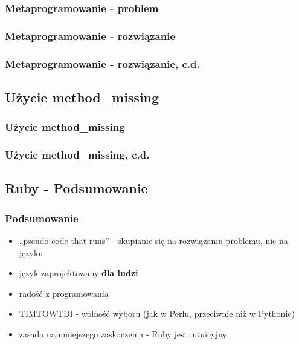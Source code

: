\documentclass[12t]{beamer}
\begin{document}
\begin{frame}[fragile]
  \frametitle{Metaprogramowanie - problem}
  
\end{frame}


\begin{frame}[fragile]
  \frametitle{Metaprogramowanie - rozwiązanie}
  
\end{frame}

\begin{frame}[fragile]
  \frametitle{Metaprogramowanie - rozwiązanie, c.d.}
  
\end{frame}

\subsection{Użycie method\_missing}
\begin{frame}[fragile]
  \frametitle{Użycie method\_missing}
  
\end{frame}

\begin{frame}[fragile]
  \frametitle{Użycie method\_missing, c.d.}
  
\end{frame}

\subsection{Ruby - Podsumowanie}
\begin{frame}
  \frametitle{Podsumowanie}
  \begin{itemize}
  \item „pseudo-code that runs” - skupianie się na rozwiązaniu
    problemu, nie na języku
  \item język zaprojektowany \textbf{dla ludzi}
  \item radość z programowania
  \item TIMTOWTDI - wolność wyboru (jak w Perlu, przeciwnie niż w
    Pythonie)
  \item zasada najmniejszego zaskoczenia - Ruby jest intuicyjny
  \end{itemize}
\end{frame}
\end{document}
